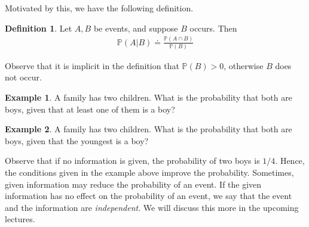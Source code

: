 \documentclass[12pt]{article}
\newcommand{\prob}{\mathbb{P}}
\theoremstyle{plain}
\theoremstyle{definition}
\newtheorem*{definition}{Definition}
\newtheorem*{example}{Example}
\theoremstyle{remark}
\numberwithin{equation}{section}  %
\begin{document}
Motivated by this, we have the following definition.
\begin{definition}
	Let $A, B$ be events, and suppose $B$ occurs. Then
	\begin{align*}
		\prob(A | B) \doteq \frac{\prob(A \cap B)}{\prob(B)}
	\end{align*}
\end{definition}
Observe that it is implicit in the definition that $\prob(B) > 0$, otherwise
$B$ does not occur.
\begin{example}
	A family has two children. What is the probability that both are boys,
	given that at least one of them is a boy?
\end{example}
\begin{example}
	A family has two children. What is the probability that both are boys,
	given that the youngest is a boy?
\end{example}
Observe that if no information is given, the probability of two boys is $1/4$.
Hence, the conditions given in the example above improve the probability.
Sometimes, given information may reduce the probability of an event.
If the given information has no effect on the probability of an event,
we say that the event and the information are \emph{independent}. We will
discuss this more in the upcoming lectures.
\end{document}
